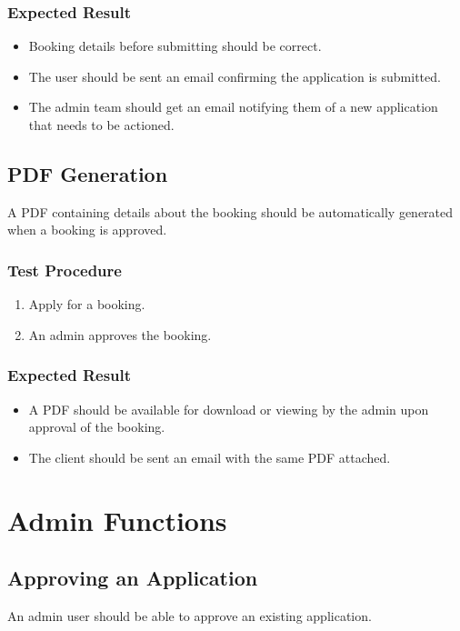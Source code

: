 \documentclass[a4paper, draft]{article}
\begin{document}
\subsubsection{Expected Result}
\begin{itemize}
    \item Booking details before submitting should be correct.
    \item The user should be sent an email confirming the application is submitted.
    \item The admin team should get an email notifying them of a new application that needs to be actioned.
\end{itemize}

\newpage
\subsection{PDF Generation} \label{pdf}
A PDF containing details about the booking should be automatically generated when a booking is approved.

\subsubsection{Test Procedure}
\begin{enumerate}
    \item Apply for a booking.
    \item An admin approves the booking.
\end{enumerate}

\subsubsection{Expected Result}
\begin{itemize}
    \item A PDF should be available for download or viewing by the admin upon approval of the booking.
    \item The client should be sent an email with the same PDF attached.
\end{itemize}

\newpage
\section{Admin Functions}
\subsection{Approving an Application}
An admin user should be able to approve an existing application.
\end{document}
